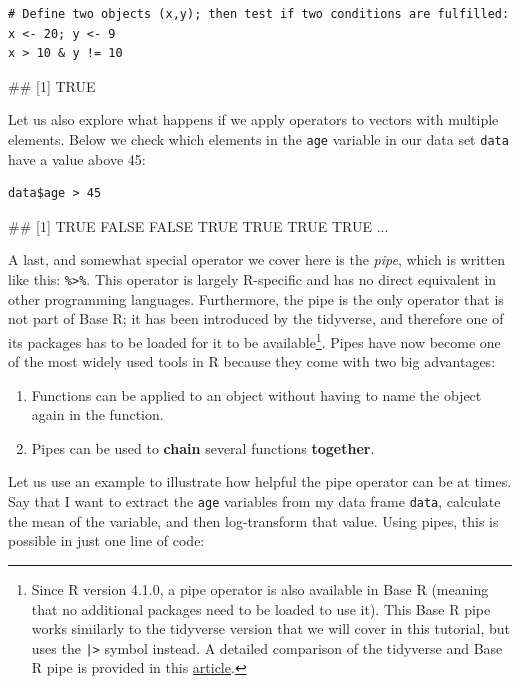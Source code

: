\begin{lstlisting}
# Define two objects (x,y); then test if two conditions are fulfilled:
x <- 20; y <- 9
x > 10 & y != 10
\end{lstlisting}
\begin{example}
## [1] TRUE
\end{example}

Let us also explore what happens if we apply operators to vectors with multiple elements. Below we check which elements in the \texttt{age} variable in our data set \texttt{data} have a value above 45:

\begin{lstlisting}
data$age > 45
\end{lstlisting}
\begin{example}
## [1]  TRUE FALSE FALSE  TRUE  TRUE  TRUE  TRUE ...
\end{example}

A last, and somewhat special operator we cover here is the \emph{pipe}, which is written like this: \texttt{\%>\%}. This operator is largely \textsf{R}-specific and has no direct equivalent in other programming languages. Furthermore, the pipe is the only operator that is not part of Base \textsf{R}; it has been introduced by the tidyverse, and therefore one of its packages has to be loaded for it to be available\footnote{Since \textsf{R} version 4.1.0, a pipe operator is also available in Base \textsf{R} (meaning that no additional packages need to be loaded to use it). This Base \textsf{R} pipe works similarly to the tidyverse version that we will cover in this tutorial, but uses the \texttt{|>} symbol instead. A detailed comparison of the tidyverse and Base \textsf{R} pipe is provided in this \href{https://web.archive.org/web/20221025022325/https://www.r-bloggers.com/2021/05/the-new-r-pipe/}{article}.}. Pipes have now become one of the most widely used tools in \textsf{R} because they come with two big advantages:

\begin{enumerate}
    \item Functions can be applied to an object without having to name the object again in the function. 
    \item Pipes can be used to \textbf{chain} several functions \textbf{together}.
\end{enumerate}

Let us use an example to illustrate how helpful the pipe operator can be at times. Say that I want to extract the \texttt{age} variables from my data frame \texttt{data}, calculate the mean of the variable, and then log-transform that value. Using pipes, this is possible in just one line of code:

